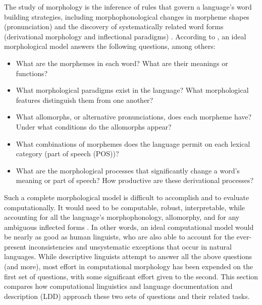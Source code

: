 \documentclass[12pt]{article}
\begin{document}
The study of morphology is the inference of rules that govern a language’s word building strategies, including morphophonological changes in morpheme shapes (pronunciation) and the discovery of systematically related word forms (derivational morphology and inflectional paradigms) \cite{roark_computational_2007}. According to , an ideal morphological model answers the following questions, among others:\begin{singlespace}

\smallskip
\begin{itemize}
    \item What are the morphemes in each word? What are their meanings or functions? 
    \item What morphological paradigms exist in the language? What morphological features distinguish them from one another?
    \item What allomorphs, or alternative pronunciations, does each morpheme have? Under what conditions do the allomorphs appear?  
    \item What combinations of morphemes does the language permit on each lexical category (part of speech (POS))?
    \item What are the morphological processes that significantly change a word's meaning or part of speech? How productive are these derivational processes?
\end{itemize}
\end{singlespace}
\smallskip

Such a complete morphological model is difficult to accomplish and to evaluate computationally. It would need to be computable, robust, interpretable, while accounting for all the language's morphophonology, allomorphy, and for any ambiguous inflected forms \cite{virpioja_empirical_2011}. In other words, an ideal computational model would be nearly as good as human linguists, who are also able to account for the ever-present inconsistencies and unsystematic exceptions that occur in natural languages. While descriptive linguists attempt to answer all the above questions (and more), most effort in computational morphology has been expended on the first set of questions, with some significant effort given to the second. This section compares how computational linguistics and language documentation and description (LDD) approach these two sets of questions and their related tasks.
\end{document}
